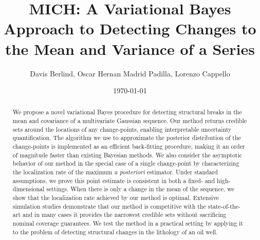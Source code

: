 \documentclass{article}
\title{MICH: A Variational Bayes Approach to Detecting Changes to the Mean and Variance of a Series}
\author{Davis Berlind, Oscar Hernan Madrid Padilla, Lorenzo Cappello}
\date{\today}
\begin{document}

\maketitle

\begin{abstract}
    We propose a novel variational Bayes procedure for detecting structural breaks in the mean and covariance of a multivariate Gaussian sequence. Our method returns credible sets around the locations of any change-points, enabling interpretable uncertainty quantification. The algorithm we use to approximate the posterior distribution of the change-points is implemented as an efficient back-fitting procedure, making it an order of magnitude faster than existing Bayesian methods. We also consider the asymptotic behavior of our method in the special case of a single change-point by characterizing the localization rate of the maximum \textit{a posteriori} estimator. Under standard assumptions, we prove this point estimate is consistent in both a fixed- and high-dimensional settings. When there is only a change in the mean of the sequence, we show that the localization rate achieved by our method is optimal. Extensive simulation studies demonstrate that our method is competitive with the state-of-the-art and in many cases it provides the narrowest credible sets without sacrificing nominal coverage guarantees. We test the method in a practical setting by applying it to the problem of detecting structural changes in the lithology of an oil well. 
\end{abstract}

















\appendix


\end{document}
